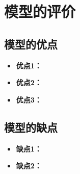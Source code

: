 
\section{模型的评价}

\subsection{模型的优点}
\begin{itemize}[itemindent=2em]
\item \textbf{优点1：}
\item \textbf{优点2：}
\item \textbf{优点3：}
\end{itemize}

\subsection{模型的缺点}
\begin{itemize}[itemindent=2em]
\item \textbf{缺点1：}
\item \textbf{缺点2：}
\end{itemize}
